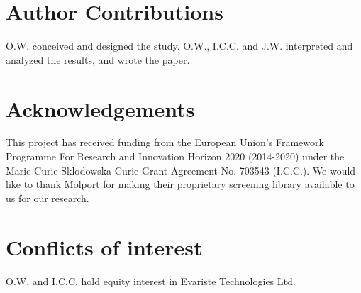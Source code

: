 \documentclass[journal=jacsat,manuscript=article]{achemso}
\begin{document}


\newpage
\section*{Author Contributions}
O.W. conceived and designed the study. 
O.W., I.C.C. and J.W. interpreted and analyzed the results, and wrote the paper.

\section*{Acknowledgements}
This project has received funding from the European Union’s Framework Programme For Research and Innovation Horizon 2020 (2014-2020) under the Marie Curie Sklodowska-Curie Grant Agreement No. 703543 (I.C.C.).
We would like to thank Molport for making their proprietary screening library available to us for our research.

\section*{Conflicts of interest}
O.W. and I.C.C. hold equity interest in Evariste Technologies Ltd.

\newpage

%

\end{document}
